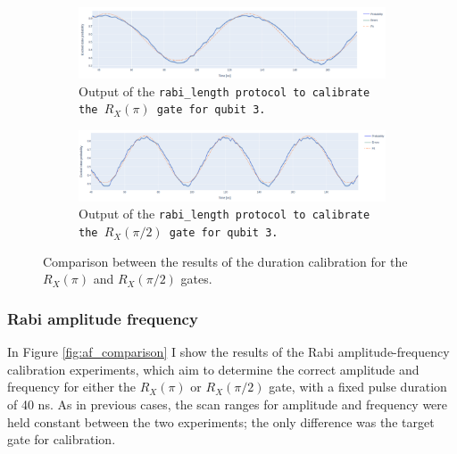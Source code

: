 \begin{figure}[h!]
    \centering
    \begin{subfigure}[t]{\textwidth}
        \includegraphics[width=\textwidth]{figures/png/RX90/RabiLength/3.png}
        \caption{Output of the \tt{rabi\_length} protocol to calibrate the $R_X(\pi)$ gate for qubit \tt{3}.}
        \label{fig:3}
    \end{subfigure}
    \vspace{0.3cm}
    \begin{subfigure}[t]{\textwidth}
        \includegraphics[width=\textwidth]{figures/png/RX90/RabiLength/3_90.png}
        \caption{Output of the \tt{rabi\_length} protocol to calibrate the $R_X(\pi/2)$ gate for qubit \tt{3}.}
        \label{fig:3_90}
    \end{subfigure}
    \caption{Comparison between the results of the duration calibration for the $R_X(\pi)$ and $R_X(\pi/2)$ gates.}
    \label{fig:duration_comparison}
\end{figure}

\subsubsection{Rabi amplitude frequency}
In Figure \ref{fig:af_comparison} I show the results of the Rabi amplitude-frequency calibration experiments, which aim to determine the correct amplitude and frequency for either the $R_X(\pi)$ or $R_X(\pi/2)$ gate, with a fixed pulse duration of 40 ns.
As in previous cases, the scan ranges for amplitude and frequency were held constant between the two experiments; the only difference was the target gate for calibration.

